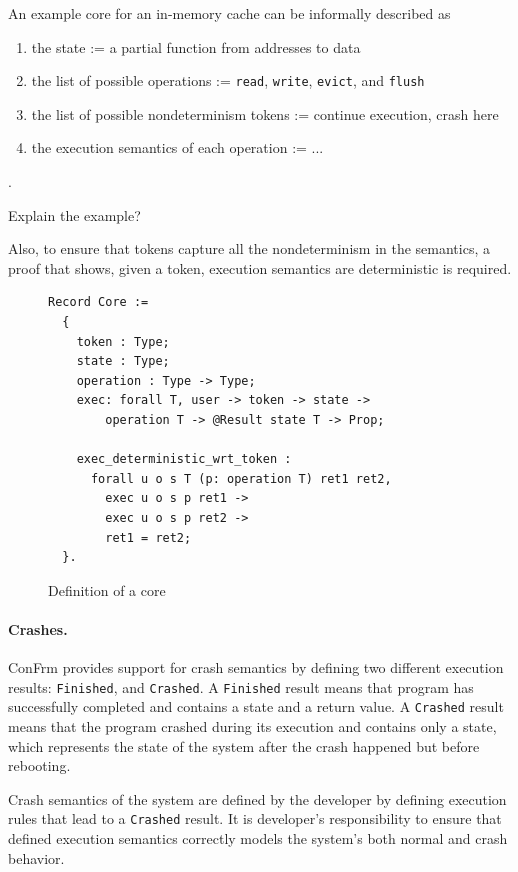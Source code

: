 An example core for an in-memory cache can be informally described as
\begin{enumerate}
    \item the state := a partial function from addresses to data
    \item the list of possible operations := \texttt{read}, \texttt{write}, \texttt{evict}, 
    and \texttt{flush}
    \item the list of possible nondeterminism tokens := continue execution, crash here
    \item the execution semantics of each operation := ...
\end{enumerate}.

{\color{red}Explain the example?}

Also, to ensure that tokens capture all the nondeterminism in the semantics, a proof that shows, given a token, execution semantics are deterministic is required.
  
\begin{figure}[ht]
    \centering
    \begin{verbatim}
Record Core :=
  {
    token : Type;
    state : Type;
    operation : Type -> Type;
    exec: forall T, user -> token -> state ->
        operation T -> @Result state T -> Prop;
    
    exec_deterministic_wrt_token :
      forall u o s T (p: operation T) ret1 ret2,
        exec u o s p ret1 ->
        exec u o s p ret2 ->
        ret1 = ret2;
  }.
    \end{verbatim}
    \caption{Definition of a core}
    \label{fig:Core_Definition}
\end{figure}

\paragraph{Crashes.}
ConFrm provides support for crash semantics by defining two different execution results: \texttt{Finished}, and \texttt{Crashed}. A \texttt{Finished} result means that program has successfully completed and contains a state and a return value. A \texttt{Crashed} result means that the program crashed during its execution and contains only a state, which represents the state of the system after the crash happened but before rebooting.

Crash semantics of the system are defined by the developer by defining execution rules that lead to a \texttt{Crashed} result. It is developer's responsibility to ensure that defined execution semantics correctly models the system's both normal and crash behavior.


